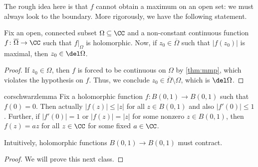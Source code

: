 The rough idea here is that $f$ cannot obtain a maximum on an open set: we must always look to the boundary. More rigorously, we have the following statement.
\begin{corollary} \label{cor:mmp}
	Fix an open, connected subset $\Omega\subseteq\CC$ and a non-constant continuous function $f\colon \overline\Omega\to\CC$ such that $f|_\Omega$ is holomorphic. Now, if $z_0\in\overline\Omega$ such that $|f(z_0)|$ is maximal, then $z_0\in\del\Omega$.
\end{corollary}
\begin{proof}
	If $z_0\in\Omega$, then $f$ is forced to be continuous on $\Omega$ by \autoref{thm:mmp}, which violates the hypothesis on $f$. Thus, we conclude $z_0\in\overline\Omega\setminus\Omega$, which is $\del\Omega$.
\end{proof}
\begin{restatable}{cor}{schwarzlemma} \label{cor:schwarz}
	Fix a holomorphic function $f\colon B(0,1)\to B(0,1)$ such that $f(0)=0$. Then actually $|f(z)|\le|z|$ for all $z\in B(0,1)$ and also $|f'(0)|\le1$. Further, if $|f'(0)|=1$ or $|f(z)|=|z|$ for some nonzero $z\in B(0,1)$, then $f(z)=az$ for all $z\in\CC$ for some fixed $a\in\CC$.
\end{restatable}
Intuitively, holomorphic functions $B(0,1)\to B(0,1)$ must contract.
\begin{proof}
	We will prove this next class.
\end{proof}